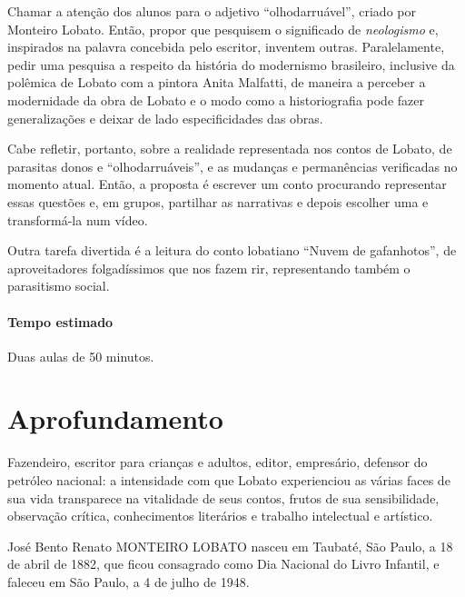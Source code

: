 \documentclass[11pt]{extarticle}
\begin{document}
Chamar a atenção dos alunos para o adjetivo ``olhodarruável'', criado
por Monteiro Lobato. Então, propor que pesquisem o significado de
\emph{neologismo} e, inspirados na palavra concebida pelo escritor,
inventem outras. Paralelamente, pedir uma pesquisa a respeito da
história do modernismo brasileiro, inclusive da polêmica de Lobato com a
pintora Anita Malfatti, de maneira a perceber a modernidade da obra de
Lobato e o modo como a historiografia pode fazer generalizações e deixar
de lado especificidades das obras.

Cabe refletir, portanto, sobre a realidade representada nos contos de
Lobato, de parasitas donos e ``olhodarruáveis'', e as mudanças e
permanências verificadas no momento atual. Então, a proposta é escrever
um conto procurando representar essas questões e, em grupos, partilhar
as narrativas e depois escolher uma e transformá-la num vídeo.


Outra tarefa divertida é a leitura do conto lobatiano ``Nuvem de
gafanhotos'', de aproveitadores folgadíssimos que nos fazem rir,
representando também o parasitismo social.

\paragraph{Tempo estimado} Duas aulas de 50 minutos.

\section{Aprofundamento}


Fazendeiro, escritor para crianças e adultos, editor, empresário,
defensor do petróleo nacional: a intensidade com que Lobato experienciou
as várias faces de sua vida transparece na vitalidade de seus contos,
frutos de sua sensibilidade, observação crítica, conhecimentos
literários e trabalho intelectual e artístico.

José Bento Renato MONTEIRO LOBATO nasceu em Taubaté, São Paulo, a 18 de
abril de 1882, que ficou consagrado como Dia Nacional do Livro Infantil,
e faleceu em São Paulo, a 4 de julho de 1948.
\end{document}
